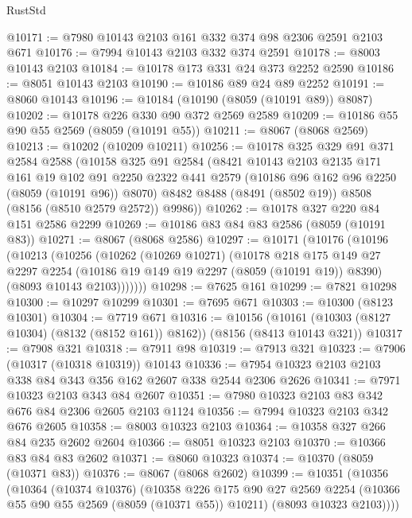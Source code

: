 \begin{lexlean}{RustStd}
\begin{coremodule}
{\begin{coremodule}
{{{{{{{{{{{{{{{{{{{{{{{{{{{{{{{{{{@10171 := @7980 @10143 @2103 @161 @332 @374 @98 @2306 @2591 @2103 @671
@10176 := @7994 @10143 @2103 @332 @374 @2591
@10178 := @8003 @10143 @2103
@10184 := @10178 @173 @331 @24 @373 @2252 @2590
@10186 := @8051 @10143 @2103
@10190 := @10186 @89 @24 @89 @2252
@10191 := @8060 @10143
@10196 := @10184 (@10190 (@8059 (@10191 @89)) @8087)
@10202 := @10178 @226 @330 @90 @372 @2569 @2589
@10209 := @10186 @55 @90 @55 @2569 (@8059 (@10191 @55))
@10211 := @8067 (@8068 @2569)
@10213 := @10202 (@10209 @10211)
@10256 := @10178
    @325
    @329
    @91
    @371
    @2584
    @2588
    (@10158
      @325
      @91
      @2584
      (@8421
        @10143
        @2103
        @2135
        @171
        @161
        @19
        @102
        @91
        @2250
        @2322
        @441
        @2579
        (@10186 @96 @162 @96 @2250 (@8059 (@10191 @96)) @8070)
        @8482
        @8488
        (@8491 (@8502 @19))
        @8508
        (@8156 (@8510 @2579 @2572))
        @9986))
@10262 := @10178 @327 @220 @84 @151 @2586 @2299
@10269 := @10186 @83 @84 @83 @2586 (@8059 (@10191 @83))
@10271 := @8067 (@8068 @2586)
@10297 := @10171
    (@10176
      (@10196
        (@10213
          (@10256
            (@10262
              (@10269 @10271)
              (@10178
                @218
                @175
                @149
                @27
                @2297
                @2254
                (@10186 @19 @149 @19 @2297 (@8059 (@10191 @19)) @8390)
                (@8093 @10143 @2103)))))))
@10298 := @7625 @161
@10299 := @7821 @10298
@10300 := @10297 @10299
@10301 := @7695 @671
@10303 := @10300 (@8123 @10301)
@10304 := @7719 @671
@10316 := @10156
    (@10161 (@10303 (@8127 @10304) (@8132 (@8152 @161)) @8162))
    (@8156 (@8413 @10143 @321))
@10317 := @7908 @321
@10318 := @7911 @98
@10319 := @7913 @321
@10323 := @7906 (@10317 (@10318 @10319)) @10143
@10336 := @7954 @10323 @2103 @2103 @338 @84 @343 @356 @162 @2607 @338 @2544 @2306 @2626
@10341 := @7971 @10323 @2103 @343 @84 @2607
@10351 := @7980 @10323 @2103 @83 @342 @676 @84 @2306 @2605 @2103 @1124
@10356 := @7994 @10323 @2103 @342 @676 @2605
@10358 := @8003 @10323 @2103
@10364 := @10358 @327 @266 @84 @235 @2602 @2604
@10366 := @8051 @10323 @2103
@10370 := @10366 @83 @84 @83 @2602
@10371 := @8060 @10323
@10374 := @10370 (@8059 (@10371 @83))
@10376 := @8067 (@8068 @2602)
@10399 := @10351
    (@10356
      (@10364
        (@10374 @10376)
        (@10358
          @226
          @175
          @90
          @27
          @2569
          @2254
          (@10366 @55 @90 @55 @2569 (@8059 (@10371 @55)) @10211)
          (@8093 @10323 @2103))))
}}}}}}}}}}}}}}}}}}}}}}}}}}}}}}}}}}
\end{coremodule}}
\end{coremodule}
\end{lexlean}
